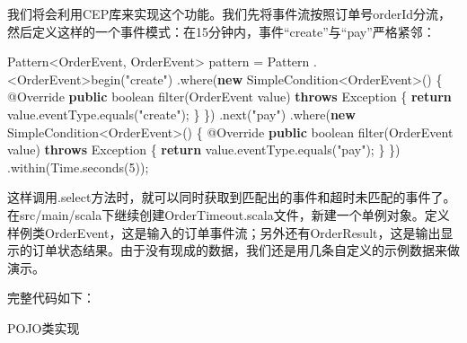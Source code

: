 \documentclass[cn,11pt,chinese]{elegantbook}
\newenvironment{Shaded}{}{}
\newcommand{\AttributeTok}[1]{\textcolor[rgb]{0.49,0.56,0.16}{#1}}
\newcommand{\BuiltInTok}[1]{#1}
\newcommand{\DataTypeTok}[1]{\textcolor[rgb]{0.56,0.13,0.00}{#1}}
\newcommand{\DecValTok}[1]{\textcolor[rgb]{0.25,0.63,0.44}{#1}}
\newcommand{\FunctionTok}[1]{\textcolor[rgb]{0.02,0.16,0.49}{#1}}
\newcommand{\KeywordTok}[1]{\textcolor[rgb]{0.00,0.44,0.13}{\textbf{#1}}}
\newcommand{\NormalTok}[1]{#1}
\newcommand{\StringTok}[1]{\textcolor[rgb]{0.25,0.44,0.63}{#1}}
\begin{document}
我们将会利用CEP库来实现这个功能。我们先将事件流按照订单号orderId分流，然后定义这样的一个事件模式：在15分钟内，事件``create''与``pay''严格紧邻：

\begin{Shaded}
\begin{Highlighting}[]
\BuiltInTok{Pattern}\NormalTok{\textless{}OrderEvent, OrderEvent\textgreater{} pattern = }\BuiltInTok{Pattern}
\NormalTok{    .\textless{}OrderEvent\textgreater{}}\FunctionTok{begin}\NormalTok{(}\StringTok{"create"}\NormalTok{)}
\NormalTok{    .}\FunctionTok{where}\NormalTok{(}\KeywordTok{new}\NormalTok{ SimpleCondition\textless{}OrderEvent\textgreater{}() \{}
        \AttributeTok{@Override}
        \KeywordTok{public} \DataTypeTok{boolean} \FunctionTok{filter}\NormalTok{(OrderEvent value) }\KeywordTok{throws} \BuiltInTok{Exception}\NormalTok{ \{}
            \KeywordTok{return}\NormalTok{ value.}\FunctionTok{eventType}\NormalTok{.}\FunctionTok{equals}\NormalTok{(}\StringTok{"create"}\NormalTok{);}
\NormalTok{        \}}
\NormalTok{    \})}
\NormalTok{    .}\FunctionTok{next}\NormalTok{(}\StringTok{"pay"}\NormalTok{)}
\NormalTok{    .}\FunctionTok{where}\NormalTok{(}\KeywordTok{new}\NormalTok{ SimpleCondition\textless{}OrderEvent\textgreater{}() \{}
        \AttributeTok{@Override}
        \KeywordTok{public} \DataTypeTok{boolean} \FunctionTok{filter}\NormalTok{(OrderEvent value) }\KeywordTok{throws} \BuiltInTok{Exception}\NormalTok{ \{}
            \KeywordTok{return}\NormalTok{ value.}\FunctionTok{eventType}\NormalTok{.}\FunctionTok{equals}\NormalTok{(}\StringTok{"pay"}\NormalTok{);}
\NormalTok{        \}}
\NormalTok{    \})}
\NormalTok{    .}\FunctionTok{within}\NormalTok{(}\BuiltInTok{Time}\NormalTok{.}\FunctionTok{seconds}\NormalTok{(}\DecValTok{5}\NormalTok{));}
\end{Highlighting}
\end{Shaded}

这样调用.select方法时，就可以同时获取到匹配出的事件和超时未匹配的事件了。
在src/main/scala下继续创建OrderTimeout.scala文件，新建一个单例对象。定义样例类OrderEvent，这是输入的订单事件流；另外还有OrderResult，这是输出显示的订单状态结果。由于没有现成的数据，我们还是用几条自定义的示例数据来做演示。

完整代码如下：

POJO类实现
\end{document}
